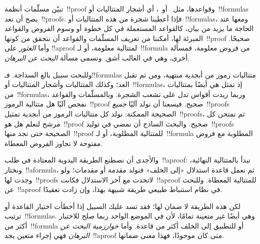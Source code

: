\documentclass[../../../include/open-logic-section]{subfiles}
\begin{document}


تبيّن مسلّمات أنظمة~!!{proof} وقواعدها، مثل~ أو~،
أي أشجار المتتاليات أو~!!{formula}s يصح أن تعد~!!{proof}s. فإذا أعطينا
شجرة من هذه المتتاليات أو~!!{formula}s، ومعها عند الحاجة ما يزيد من بيان، كالقواعد المستعملة في كل
خطوة أو وسوم الفروض والقواعد المبرئة لها، أمكننا من تعريف المسلّمات
والقواعد أن نتحقق من كونها~!!{proof} صحيحًا. وأما \emph{العثور} على
!!a{proof} لمتتالية معلومة، أو لـ~!!{formula} من فروض معلومة، فمسألة
أخرى، وهي في الغالب أشق. وتسمى مسألة \emph{البحث عن البرهان}.

وللبحث سبيل بالغ السذاجة. فـ!!{formula}s متتاليات رموز من أبجدية منتهية،
ومن ثم تقبل العد؛ وكذلك المتتاليات وأشجار المتتاليات أو~!!{formula}s،
إذ تمثل هي أيضًا بمتتاليات من~!!{formula}s، وربما زيدت أقواس تدل على
تشعب الشجرة. وبالمسلّمات والقواعد نفحص آليًا هل متتالية الرموز~!!{proof}
صحيح. فيسعنا أن نولد آليًا \emph{جميع}~!!{proof}s الصحيحة الممكنة: نولد
كل متتاليات الرموز من أبجدية تمثيل~!!{proof}s، ثم نمتحن كل مرشح لنعلم
هل هو~!!{proof} صحيح. والبحث الساذج أن نمضي في توليد~!!{proof}s الصحيحة
حتى نجد منها~!!{proof} للمتتالية المطلوبة، أو لـ~!!{formula} المطلوبة
مع فروض مفتوحة لا تجاوز الفروض المعطاة.

والأجدى أن نصطنع الطريقة اليدوية المعتادة في طلب~!!a{proof}: نبدأ
بالمتتالية النهائية، ونختار~!!a{formula}، ثم نعمل قاعدة استدلال «إلى
الخلف» فنولد مقدمة أو مقدمات؛ ولو وجدت لها~!!{proof}s لاتحدت مع آخر
الاستدلال فكانت~!!a{proof} للمتتالية المعطاة. وللبحث عن~!!a{proof} في
نظام استنباط طبيعي طريقة شبيهة بهذا، وإن زادت تعقيدًا.

لكن هذه الطريقة لا ضمان لها؛ فقد تسد عليك السبيل إذا أخطأت اختيار القاعدة
أو ترتيب~!!{formula}s. وهي أيضًا غير متعينة تمامًا، لأن في الموضع الواحد
ربما صلح للاختيار أكثر من~!!{formula} أو للتطبيق إلى الخلف أكثر من قاعدة.
وأما \emph{خوارزمية البحث عن البرهان} فهي إجراء متعين يجد~!!a{proof}
متى كان موجودًا، فهذا معنى ضمانها.
\end{document}

